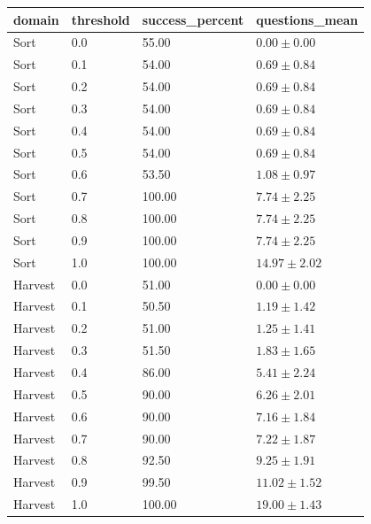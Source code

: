 \begin{tabular}{llll}
\hline
domain & threshold & success\_percent & questions\_mean \\
\hline
Sort & 0.0 & 55.00 & $0.00 \pm 0.00$ \\
Sort & 0.1 & 54.00 & $0.69 \pm 0.84$ \\
Sort & 0.2 & 54.00 & $0.69 \pm 0.84$ \\
Sort & 0.3 & 54.00 & $0.69 \pm 0.84$ \\
Sort & 0.4 & 54.00 & $0.69 \pm 0.84$ \\
Sort & 0.5 & 54.00 & $0.69 \pm 0.84$ \\
Sort & 0.6 & 53.50 & $1.08 \pm 0.97$ \\
Sort & 0.7 & 100.00 & $7.74 \pm 2.25$ \\
Sort & 0.8 & 100.00 & $7.74 \pm 2.25$ \\
Sort & 0.9 & 100.00 & $7.74 \pm 2.25$ \\
Sort & 1.0 & 100.00 & $14.97 \pm 2.02$ \\
Harvest & 0.0 & 51.00 & $0.00 \pm 0.00$ \\
Harvest & 0.1 & 50.50 & $1.19 \pm 1.42$ \\
Harvest & 0.2 & 51.00 & $1.25 \pm 1.41$ \\
Harvest & 0.3 & 51.50 & $1.83 \pm 1.65$ \\
Harvest & 0.4 & 86.00 & $5.41 \pm 2.24$ \\
Harvest & 0.5 & 90.00 & $6.26 \pm 2.01$ \\
Harvest & 0.6 & 90.00 & $7.16 \pm 1.84$ \\
Harvest & 0.7 & 90.00 & $7.22 \pm 1.87$ \\
Harvest & 0.8 & 92.50 & $9.25 \pm 1.91$ \\
Harvest & 0.9 & 99.50 & $11.02 \pm 1.52$ \\
Harvest & 1.0 & 100.00 & $19.00 \pm 1.43$ \\
\hline
\end{tabular}

